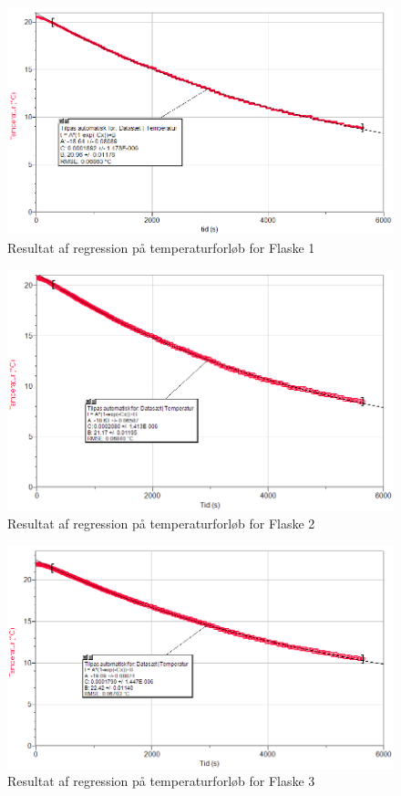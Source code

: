\documentclass[Hovedrapport.tex]{subfiles}
\begin{document}
\begin{figure}[H]
    \centering
    \includegraphics[width=\textwidth]{Billeder/tempreg1}
    \caption{Resultat af regression på temperaturforløb for Flaske 1}
    \label{fig:tempreg1}
\end{figure}

\begin{figure}[H]
    \centering
    \includegraphics[width=\textwidth]{Billeder/tempreg2}
    \caption{Resultat af regression på temperaturforløb for Flaske 2}
    \label{fig:tempreg2}
\end{figure}

\begin{figure}[H]
    \centering
    \includegraphics[width=\textwidth]{Billeder/tempreg3}
    \caption{Resultat af regression på temperaturforløb for Flaske 3}
    \label{fig:tempreg3}
\end{figure}
\end{document}
